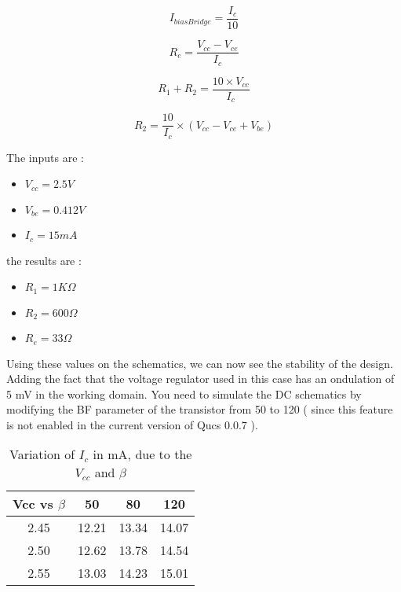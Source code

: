 \begin{equation}
I_{biasBridge} = \frac{I_c}{10}
\end{equation}

\begin{equation}
R_e = \frac{V_{cc} - V_{ce}}{I_c}
\end{equation}


\begin{equation}
R_1 + R_2 = \frac{10 \times V_{cc}}{I_c}
\end{equation}

\begin{equation}
R_2 = \frac{10}{I_c} \times ( V_{cc} - V_{ce} + V_{be} )
\end{equation}


The inputs are :
\begin{itemize}
\item $V_{cc} = 2.5 V$
\item $V_{be} = 0.412 V$
\item $I_c = 15 mA$
\end{itemize}

the results are :
\begin{itemize}
\item $R_1 = 1 K\Omega$
\item $R_2 = 600 \Omega$
\item $R_e = 33 \Omega$
\end{itemize}

Using these values on the schematics, we can now see the stability of the design. Adding the fact that the voltage regulator used in this case has an ondulation of 5 mV in the working domain.  You need to simulate the DC schematics by modifying the BF parameter of the transistor from 50 to 120 ( since this feature is not enabled in the current version of Qucs $0.0.7$ ).


\begin{table}[htdp]
\caption{Variation of $I_c$ in mA, due to the $V_{cc}$ and $\beta$}
\begin{center}
\begin{tabular}{|c|c|c|c|} \hline
Vcc  vs $\beta$ & 50 & 80 & 120 \\ \hline
2.45	&	12.21	&	13.34	&	14.07	\\
2.50	&	12.62	&	13.78	&	14.54	\\
2.55 	&	13.03	&	14.23	&	15.01	\\ \hline
\end{tabular}
\end{center}
\label{design:pa:bias:variation}
\end{table}

